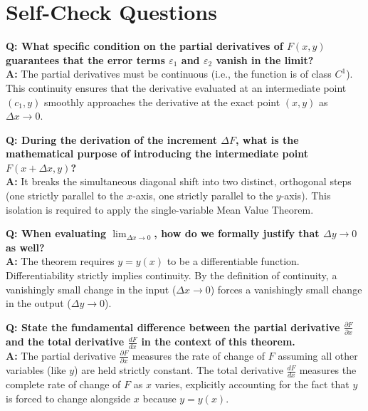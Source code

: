 \documentclass{essay}
\begin{document}
\section{Self-Check Questions}

\textbf{Q: What specific condition on the partial derivatives of $F(x,y)$ guarantees that the error terms $\varepsilon_1$ and $\varepsilon_2$ vanish in the limit?} \\
\textbf{A:} The partial derivatives must be continuous (i.e., the function is of class $C^1$). This continuity ensures that the derivative evaluated at an intermediate point $(c_1, y)$ smoothly approaches the derivative at the exact point $(x,y)$ as $\Delta x \to 0$.

\vspace{1em}
\textbf{Q: During the derivation of the increment $\Delta F$, what is the mathematical purpose of introducing the intermediate point $F(x+\Delta x, y)$?} \\
\textbf{A:} It breaks the simultaneous diagonal shift into two distinct, orthogonal steps (one strictly parallel to the $x$-axis, one strictly parallel to the $y$-axis). This isolation is required to apply the single-variable Mean Value Theorem.

\vspace{1em}
\textbf{Q: When evaluating $\lim_{\Delta x \to 0}$, how do we formally justify that $\Delta y \to 0$ as well?} \\
\textbf{A:} The theorem requires $y = y(x)$ to be a differentiable function. Differentiability strictly implies continuity. By the definition of continuity, a vanishingly small change in the input ($\Delta x \to 0$) forces a vanishingly small change in the output ($\Delta y \to 0$).

\vspace{1em}
\textbf{Q: State the fundamental difference between the partial derivative $\frac{\partial F}{\partial x}$ and the total derivative $\frac{dF}{dx}$ in the context of this theorem.} \\
\textbf{A:} The partial derivative $\frac{\partial F}{\partial x}$ measures the rate of change of $F$ assuming all other variables (like $y$) are held strictly constant. The total derivative $\frac{dF}{dx}$ measures the complete rate of change of $F$ as $x$ varies, explicitly accounting for the fact that $y$ is forced to change alongside $x$ because $y = y(x)$.
\end{document}
